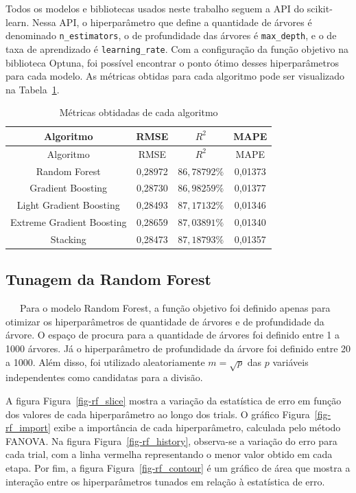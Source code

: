 \documentclass[
  12pt,
  a4paper,
]{scrreprt}
\begin{document}
\vspace{12pt}

Todos os modelos e bibliotecas usados neste trabalho seguem a API do
scikit-learn. Nessa API, o hiperparâmetro que define a quantidade de
árvores é denominado \texttt{n\_estimators}, o de profundidade das
árvores é \texttt{max\_depth}, e o de taxa de aprendizado é
\texttt{learning\_rate}. Com a configuração da função objetivo na
biblioteca Optuna, foi possível encontrar o ponto ótimo desses
hiperparâmetros para cada modelo. As métricas obtidas para cada
algoritmo pode ser visualizado na Tabela~\ref{tbl-metrics_models}.

\begin{longtable}[]{@{}cccc@{}}
\caption{Métricas obtidadas de cada
algoritmo}\label{tbl-metrics_models}\tabularnewline
\toprule\noalign{}
Algoritmo & RMSE & \(R^2\) & MAPE \\
\midrule\noalign{}
\endfirsthead
\toprule\noalign{}
Algoritmo & RMSE & \(R^2\) & MAPE \\
\midrule\noalign{}
\endhead
\bottomrule\noalign{}
\endlastfoot
Random Forest & 0,28972 & \(86,78792\%\) & 0,01373 \\
Gradient Boosting & 0,28730 & \(86,98259\%\) & 0,01377 \\
Light Gradient Boosting & 0,28493 & \(87,17132\%\) & 0,01346 \\
Extreme Gradient Boosting & 0,28659 & \(87,03891\%\) & 0,01340 \\
Stacking & 0,28473 & \(87,18793\%\) & 0,01357 \\
\end{longtable}

\subsection{Tunagem da Random Forest}\label{tunagem-da-random-forest}

~~~Para o modelo Random Forest, a função objetivo foi definido apenas
para otimizar os hiperparâmetros de quantidade de árvores e de
profundidade da árvore. O espaço de procura para a quantidade de árvores
foi definido entre 1 a 1000 árvores. Já o hiperparâmetro de profundidade
da árvore foi definido entre 20 a 1000. Além disso, foi utilizado
aleatoriamente \(m = \sqrt{p}\) das \(p\) variáveis independentes como
candidatas para a divisão.

\vspace{12pt}

A figura Figura~\ref{fig-rf_slice} mostra a variação da estatística de
erro em função dos valores de cada hiperparâmetro ao longo dos trials. O
gráfico Figura~\ref{fig-rf_import} exibe a importância de cada
hiperparâmetro, calculada pelo método FANOVA. Na figura
Figura~\ref{fig-rf_history}, observa-se a variação do erro para cada
trial, com a linha vermelha representando o menor valor obtido em cada
etapa. Por fim, a figura Figura~\ref{fig-rf_contour} é um gráfico de
área que mostra a interação entre os hiperparâmetros tunados em relação
à estatística de erro.
\end{document}
